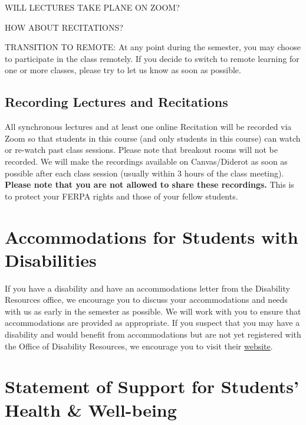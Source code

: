 \begin{gram}

WILL LECTURES TAKE PLANE ON ZOOM?

HOW ABOUT RECITATIONS?


TRANSITION TO REMOTE:
At any point during the semester, you may choose to participate in the class remotely. If you decide to switch to remote learning for one or more classes, please try to let us know as soon as possible. 

\end{gram}


\subsection{Recording Lectures and Recitations}
All synchronous lectures and at least one online Recitation will be recorded via Zoom so that students in this course (and only students in this course) can watch or re-watch past class sessions. Please note that breakout rooms will not be recorded. We will make the recordings available on Canvas/Diderot as soon as possible after each class session (usually within 3 hours of the class meeting). \textbf{Please note that you are not allowed to share these recordings.} This is to protect your FERPA rights and those of your fellow students. 


\section{Accommodations for Students with Disabilities}
If you have a disability and have an accommodations letter from the Disability Resources office, we encourage you to discuss your accommodations and needs with us as early in the semester as possible. We will work with you to ensure that accommodations are provided as appropriate. If you suspect that you may have a disability and would benefit from accommodations but are not yet registered with the Office of Disability Resources, we encourage you to visit their \href{https://www.cmu.edu/disability-resources/}{website}.

\section{Statement of Support for Students’ Health \& Well-being}

